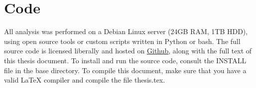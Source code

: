 
\chapter{Code}

All analysis was performed on a Debian Linux server (24GB RAM, 1TB HDD), using open source tools or custom scripts written in Python or bash.
The full source code is licensed liberally and hosted on \href{https://github.com/New-College-of-Florida/Jonathan-Niles-Thesis}{\underline{Github}},
along with the full text of this thesis document.  To install and run the source code, consult the INSTALL file in the base directory.  To
compile this document, make sure that you have a valid \LaTeX{} compiler and compile the file thesis.tex.
